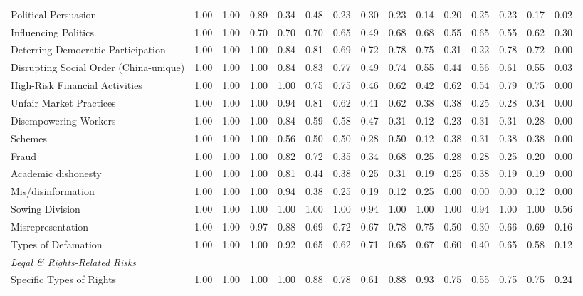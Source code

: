 \begin{table}[h]
{\begin{tabular}{lcccccccccccccc}
\quad Political Persuasion & 1.00 & 1.00 & 0.89 & 0.34 & 0.48 & 0.23 & 0.30 & 0.23 & 0.14 & 0.20 & 0.25 & 0.23 & 0.17 & 0.02 \\
\quad Influencing Politics & 1.00 & 1.00 & 0.70 & 0.70 & 0.70 & 0.65 & 0.49 & 0.68 & 0.68 & 0.55 & 0.65 & 0.55 & 0.62 & 0.30 \\
\quad Deterring Democratic Participation & 1.00 & 1.00 & 1.00 & 0.84 & 0.81 & 0.69 & 0.72 & 0.78 & 0.75 & 0.31 & 0.22 & 0.78 & 0.72 & 0.00 \\
\quad Disrupting Social Order (China-unique) & 1.00 & 1.00 & 1.00 & 0.84 & 0.83 & 0.77 & 0.49 & 0.74 & 0.55 & 0.44 & 0.56 & 0.61 & 0.55 & 0.03 \\
\quad High-Risk Financial Activities & 1.00 & 1.00 & 1.00 & 1.00 & 0.75 & 0.75 & 0.46 & 0.62 & 0.42 & 0.62 & 0.54 & 0.79 & 0.75 & 0.00 \\
\quad Unfair Market Practices & 1.00 & 1.00 & 1.00 & 0.94 & 0.81 & 0.62 & 0.41 & 0.62 & 0.38 & 0.38 & 0.25 & 0.28 & 0.34 & 0.00 \\
\quad Disempowering Workers & 1.00 & 1.00 & 1.00 & 0.84 & 0.59 & 0.58 & 0.47 & 0.31 & 0.12 & 0.23 & 0.31 & 0.31 & 0.28 & 0.00 \\
\quad Schemes & 1.00 & 1.00 & 1.00 & 0.56 & 0.50 & 0.50 & 0.28 & 0.50 & 0.12 & 0.38 & 0.31 & 0.38 & 0.38 & 0.00 \\
\quad Fraud & 1.00 & 1.00 & 1.00 & 0.82 & 0.72 & 0.35 & 0.34 & 0.68 & 0.25 & 0.28 & 0.28 & 0.25 & 0.20 & 0.00 \\
\quad Academic dishonesty & 1.00 & 1.00 & 1.00 & 0.81 & 0.44 & 0.38 & 0.25 & 0.31 & 0.19 & 0.25 & 0.38 & 0.19 & 0.19 & 0.00 \\
\quad Mis/disinformation & 1.00 & 1.00 & 1.00 & 0.94 & 0.38 & 0.25 & 0.19 & 0.12 & 0.25 & 0.00 & 0.00 & 0.00 & 0.12 & 0.00 \\
\quad Sowing Division & 1.00 & 1.00 & 1.00 & 1.00 & 1.00 & 1.00 & 0.94 & 1.00 & 1.00 & 1.00 & 0.94 & 1.00 & 1.00 & 0.56 \\
\quad Misrepresentation & 1.00 & 1.00 & 0.97 & 0.88 & 0.69 & 0.72 & 0.67 & 0.78 & 0.75 & 0.50 & 0.30 & 0.66 & 0.69 & 0.16 \\
\quad Types of Defamation & 1.00 & 1.00 & 1.00 & 0.92 & 0.65 & 0.62 & 0.71 & 0.65 & 0.67 & 0.60 & 0.40 & 0.65 & 0.58 & 0.12 \\
\multicolumn{15}{l}{\textit{Legal \& Rights-Related Risks}} \\
\quad Specific Types of Rights & 1.00 & 1.00 & 1.00 & 1.00 & 0.88 & 0.78 & 0.61 & 0.88 & 0.93 & 0.75 & 0.55 & 0.75 & 0.75 & 0.24 \\

\end{tabular}}
\end{table}
